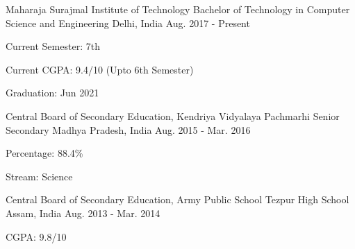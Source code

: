 

\begin{cventries}

  \cventry
    {Maharaja Surajmal Institute of Technology} %
    {Bachelor of Technology in Computer Science and Engineering} %
    {Delhi, India} %
    {Aug. 2017 - Present} %
    {
      \begin{cvitems} %
        \item {Current Semester: 7th}
        \item {Current CGPA: 9.4/10 (Upto 6th Semester)}
        \item {Graduation: Jun 2021}
      \end{cvitems}
    }

  \cventry
    {Central Board of Secondary Education, Kendriya Vidyalaya Pachmarhi} %
    {Senior Secondary} %
    {Madhya Pradesh, India} %
    {Aug. 2015 - Mar. 2016} %
    {
      \begin{cvitems} %
        \item {Percentage: 88.4\%}
        \item {Stream: Science}
      \end{cvitems}
    }

  \cventry
    {Central Board of Secondary Education, Army Public School Tezpur} %
    {High School} %
    {Assam, India} %
    {Aug. 2013 - Mar. 2014} %
    {
      \begin{cvitems} %
        \item {CGPA: 9.8/10}
      \end{cvitems}
    }
    
\end{cventries}
